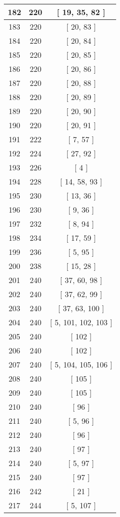 \begin{center}
\begin{longtable}[H]{|| c c c ||}
\hline
182 & 220 & [ 19, 35, 82 ] \\ 
\hline
183 & 220 & [ 20, 83 ] \\ 
\hline
184 & 220 & [ 20, 84 ] \\ 
\hline
185 & 220 & [ 20, 85 ] \\ 
\hline
186 & 220 & [ 20, 86 ] \\ 
\hline
187 & 220 & [ 20, 88 ] \\ 
\hline
188 & 220 & [ 20, 89 ] \\ 
\hline
189 & 220 & [ 20, 90 ] \\ 
\hline
190 & 220 & [ 20, 91 ] \\ 
\hline
191 & 222 & [ 7, 57 ] \\ 
\hline
192 & 224 & [ 27, 92 ] \\ 
\hline
193 & 226 & [ 4 ] \\ 
\hline
194 & 228 & [ 14, 58, 93 ] \\ 
\hline
195 & 230 & [ 13, 36 ] \\ 
\hline
196 & 230 & [ 9, 36 ] \\ 
\hline
197 & 232 & [ 8, 94 ] \\ 
\hline
198 & 234 & [ 17, 59 ] \\ 
\hline
199 & 236 & [ 5, 95 ] \\ 
\hline
200 & 238 & [ 15, 28 ] \\ 
\hline
201 & 240 & [ 37, 60, 98 ] \\ 
\hline
202 & 240 & [ 37, 62, 99 ] \\ 
\hline
203 & 240 & [ 37, 63, 100 ] \\ 
\hline
204 & 240 & [ 5, 101, 102, 103 ] \\ 
\hline
205 & 240 & [ 102 ] \\ 
\hline
206 & 240 & [ 102 ] \\ 
\hline
207 & 240 & [ 5, 104, 105, 106 ] \\ 
\hline
208 & 240 & [ 105 ] \\ 
\hline
209 & 240 & [ 105 ] \\ 
\hline
210 & 240 & [ 96 ] \\ 
\hline
211 & 240 & [ 5, 96 ] \\ 
\hline
212 & 240 & [ 96 ] \\ 
\hline
213 & 240 & [ 97 ] \\ 
\hline
214 & 240 & [ 5, 97 ] \\ 
\hline
215 & 240 & [ 97 ] \\ 
\hline
216 & 242 & [ 21 ] \\ 
\hline
217 & 244 & [ 5, 107 ] \\ 

\end{longtable}
\end{center}
